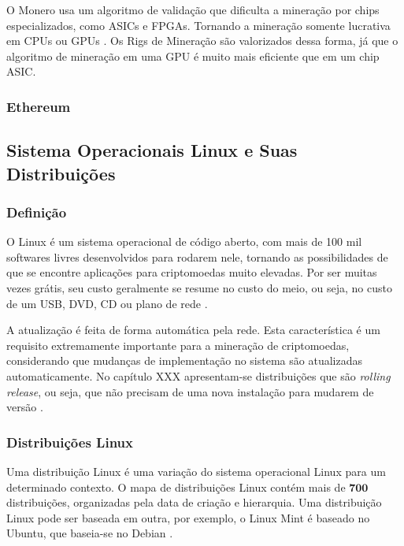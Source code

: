 \documentclass[
article,			%
12pt,				%
openright,			%
oneside,			%
a4paper,			%
chapter=TITLE,		%
section=TITLE,		%
subsection=TITLE,	%
subsubsection=TITLE,%
subsubsubsection=TITLE, %
english,			%
brazil,				%
]{abntex2}
\begin{document}
O Monero usa um algoritmo de validação que dificulta a mineração por
chips especializados, como ASICs e FPGAs.  Tornando a mineração
somente lucrativa em CPUs ou GPUs \cite{Weber2012}. Os Rigs de
Mineração são valorizados dessa forma, já que o algoritmo de mineração
em uma GPU é muito mais eficiente que em um chip ASIC\@.

\subsubsection{Ethereum}

\subsection{Sistema Operacionais Linux e Suas
Distribuições}\label{cap:sistemas-linux}

\subsubsection{Definição}

O Linux é um sistema operacional de código aberto, com mais de 100 mil
softwares livres desenvolvidos para rodarem nele, tornando as
possibilidades de que se encontre aplicações para criptomoedas muito
elevadas. Por ser muitas vezes grátis, seu custo geralmente se resume
no custo do meio, ou seja, no custo de um USB, DVD, CD ou plano de
rede \cite{Nunes2009}.

A atualização é feita de forma automática pela rede. Esta
característica é um requisito extremamente importante para a mineração
de criptomoedas, considerando que mudanças de implementação no sistema
são atualizadas automaticamente. No capítulo XXX apresentam-se
distribuições que são \emph{rolling release}, ou seja, que não
precisam de uma nova instalação para mudarem de versão
\cite{Nunes2009, ArchWiki2018a}.

\subsubsection{Distribuições Linux}

Uma distribuição Linux é uma variação do sistema operacional Linux
para um determinado contexto. O mapa de distribuições Linux contém
mais de $\mathbf{700}$ distribuições, organizadas pela data de criação
e hierarquia. Uma distribuição Linux pode ser baseada em outra, por
exemplo, o Linux Mint é baseado no Ubuntu, que baseia-se no Debian
\cite{Loli2017}.
\end{document}
